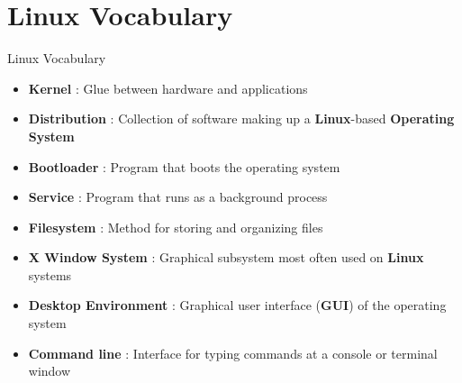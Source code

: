 \section{Linux Vocabulary}

\begin{frame}
   {Linux Vocabulary}

   \begin{itemize}
      \item \textbf{Kernel} : Glue between hardware and
      applications
      \item \textbf{Distribution} : Collection of software
      making up a \textbf{Linux}-based \textbf{Operating System}
      \item \textbf{Bootloader} : Program that boots the
      operating system
      \item \textbf{Service} : Program that runs as a background
      process
      \item \textbf{Filesystem} : Method for storing and
      organizing files
      \item \textbf{X Window System} : Graphical subsystem
      most often used on \textbf{Linux} systems
      \item \textbf{Desktop Environment} : Graphical user
      interface (\textbf{GUI}) of the operating system
      \item \textbf{Command line} : Interface for typing
      commands at a console or terminal window
   \end{itemize}

\end{frame}

